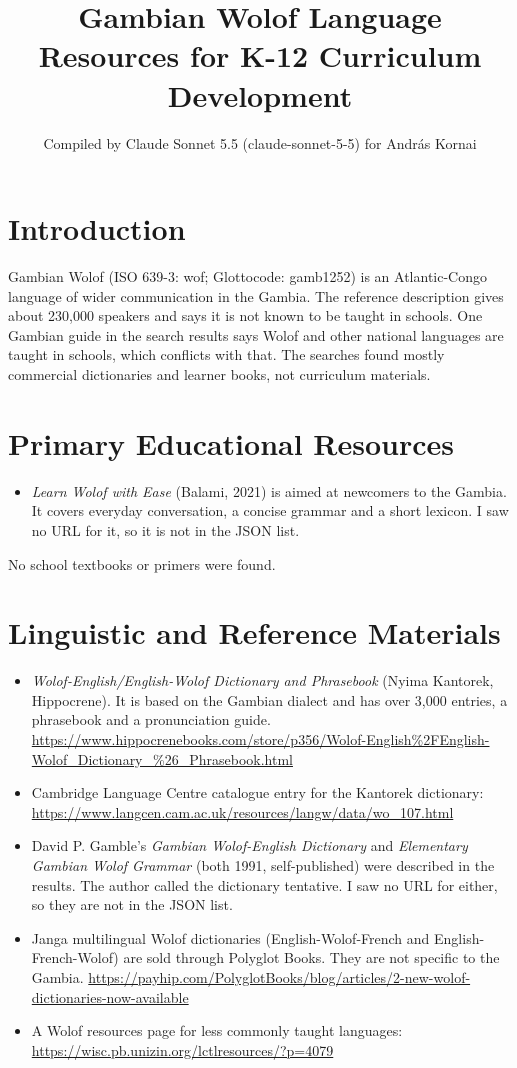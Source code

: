 \documentclass[12pt]{article}
\title{Gambian Wolof Language Resources for K-12 Curriculum Development}
\author{Compiled by Claude Sonnet 5.5 (claude-sonnet-5-5) for Andr\'as Kornai}
\date{}
\begin{document}
\maketitle

\section{Introduction}
Gambian Wolof (ISO 639-3: wof; Glottocode: gamb1252) is an Atlantic-Congo language of wider communication in the Gambia. The reference description gives about 230,000 speakers and says it is not known to be taught in schools. One Gambian guide in the search results says Wolof and other national languages are taught in schools, which conflicts with that. The searches found mostly commercial dictionaries and learner books, not curriculum materials.

\section{Primary Educational Resources}
\begin{itemize}
\item \emph{Learn Wolof with Ease} (Balami, 2021) is aimed at newcomers to the Gambia. It covers everyday conversation, a concise grammar and a short lexicon. I saw no URL for it, so it is not in the JSON list.
\end{itemize}
No school textbooks or primers were found.

\section{Linguistic and Reference Materials}
\begin{itemize}
\item \emph{Wolof-English/English-Wolof Dictionary and Phrasebook} (Nyima Kantorek, Hippocrene). It is based on the Gambian dialect and has over 3,000 entries, a phrasebook and a pronunciation guide. \url{https://www.hippocrenebooks.com/store/p356/Wolof-English%2FEnglish-Wolof_Dictionary_%26_Phrasebook.html}
\item Cambridge Language Centre catalogue entry for the Kantorek dictionary: \url{https://www.langcen.cam.ac.uk/resources/langw/data/wo_107.html}
\item David P. Gamble's \emph{Gambian Wolof-English Dictionary} and \emph{Elementary Gambian Wolof Grammar} (both 1991, self-published) were described in the results. The author called the dictionary tentative. I saw no URL for either, so they are not in the JSON list.
\item Janga multilingual Wolof dictionaries (English-Wolof-French and English-French-Wolof) are sold through Polyglot Books. They are not specific to the Gambia. \url{https://payhip.com/PolyglotBooks/blog/articles/2-new-wolof-dictionaries-now-available}
\item A Wolof resources page for less commonly taught languages: \url{https://wisc.pb.unizin.org/lctlresources/?p=4079}
\end{itemize}
\end{document}
